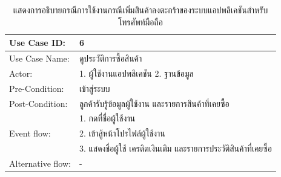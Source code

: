 \begin{table}[htbp]
  \centering
  \caption{แสดงการอธิบายกรณีการใช้งานกรณีเพิ่มสินค้าลงตะกร้าของระบบแอปพลิเคชันสำหรับโทรศัพท์มือถือ}
  \begin{tabularx}{\textwidth}{|p{3cm}|X|}
    \hline
    \multirow{1}{3cm}{Use Case ID:}      & 6                                     \\
    \hline
    \multirow{1}{3cm}{Use Case Name:}    & ดูประวัติการซื้อสินค้า                       \\
    \hline
    \multirow{1}{3cm}{Actor:}            & 1. ผู้ใช้งานแอปพลิเคชัน 2. ฐานข้อมูล         \\
    \hline
    \multirow{1}{3cm}{Pre-Condition:}    & เข้าสู่ระบบ                              \\
    \hline
    \multirow{1}{3cm}{Post-Condition:}   & ลูกค้ารับรู้ข้อมูลผู้ใช้งาน และรายการสินค้าที่เคยซื้อ \\
    \hline
    \multirow{3}{3cm}{Event flow:}       & 1. กดที่ชื่อผู้ใช้งาน                        \\
                                         & 2. เข้าสู้หน้าโปรไฟล์ผู้ใช้งาน                \\ & 3. แสดงชื่อผู้ใช้ เครดิตเงินเติม และรายการประวัติสินค้าที่เคยซื้อ \\
    \hline
    \multirow{1}{3cm}{Alternative flow:} & -                                     \\
    \hline
  \end{tabularx}
\end{table}

